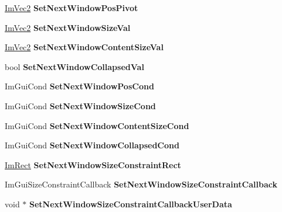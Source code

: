 \begin{DoxyCompactItemize}
\hyperlink{struct_im_vec2}{Im\+Vec2} {\bfseries Set\+Next\+Window\+Pos\+Pivot}
\item 
\mbox{\label{struct_im_gui_context_a80a09eeab06dd8abaa79cc5d26998af4}} 
\hyperlink{struct_im_vec2}{Im\+Vec2} {\bfseries Set\+Next\+Window\+Size\+Val}
\item 
\mbox{\label{struct_im_gui_context_aa861c8e8d3b52e2fe8b581a4a132c39b}} 
\hyperlink{struct_im_vec2}{Im\+Vec2} {\bfseries Set\+Next\+Window\+Content\+Size\+Val}
\item 
\mbox{\label{struct_im_gui_context_a81c9c14d3ab622586aa5ca0866634b21}} 
bool {\bfseries Set\+Next\+Window\+Collapsed\+Val}
\item 
\mbox{\label{struct_im_gui_context_afdf440b5e79ba7868e87e2c5136e1296}} 
Im\+Gui\+Cond {\bfseries Set\+Next\+Window\+Pos\+Cond}
\item 
\mbox{\label{struct_im_gui_context_ad0a5c6930741d040141ab7b097064c20}} 
Im\+Gui\+Cond {\bfseries Set\+Next\+Window\+Size\+Cond}
\item 
\mbox{\label{struct_im_gui_context_af19b3352e14a7ac48f8c9a58e63eda9b}} 
Im\+Gui\+Cond {\bfseries Set\+Next\+Window\+Content\+Size\+Cond}
\item 
\mbox{\label{struct_im_gui_context_a90e757b4703c106ecd41b05670f5799a}} 
Im\+Gui\+Cond {\bfseries Set\+Next\+Window\+Collapsed\+Cond}
\item 
\mbox{\label{struct_im_gui_context_ab0e529d62651845ef9ae265447e1d0c8}} 
\hyperlink{struct_im_rect}{Im\+Rect} {\bfseries Set\+Next\+Window\+Size\+Constraint\+Rect}
\item 
\mbox{\label{struct_im_gui_context_a304a1bfd5dbcebee45ba8cdfa5d231cb}} 
Im\+Gui\+Size\+Constraint\+Callback {\bfseries Set\+Next\+Window\+Size\+Constraint\+Callback}
\item 
\mbox{\label{struct_im_gui_context_a5da8374c369cff287b16ac7d8e3a7901}} 
void $\ast$ {\bfseries Set\+Next\+Window\+Size\+Constraint\+Callback\+User\+Data}

\end{DoxyCompactItemize}
